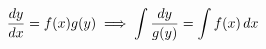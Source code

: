 \documentclass[preview]{standalone}
\begin{document}
\begin{align*}
\special{dvisvgm:raw <g id='unique000'>}\frac{dy}{dx} = f(x)g(y) \implies \int \frac{dy}{g(y)} = \int f(x)\,dx\special{dvisvgm:raw </g>}
\end{align*}
\end{document}

